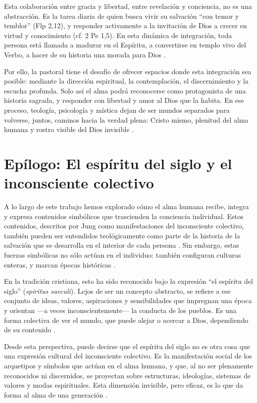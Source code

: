 \documentclass[a4paper,12pt]{article}
\begin{document}
Esta colaboración entre gracia y libertad, entre revelación y conciencia, no es una abstracción. Es la tarea diaria de quien busca vivir su salvación “con temor y temblor” \cite{bibid}(Flp 2,12), y responder activamente a la invitación de Dios a crecer en virtud y conocimiento \cite{bibid}(cf. 2 Pe 1,5). En esta dinámica de integración, toda persona está llamada a madurar en el Espíritu, a convertirse en templo vivo del Verbo, a hacer de su historia una morada para Dios \cite{jung1959}.

Por ello, la pastoral tiene el desafío de ofrecer espacios donde esta integración sea posible: mediante la dirección espiritual, la contemplación, el discernimiento y la escucha profunda. Solo así el alma podrá reconocerse como protagonista de una historia sagrada, y responder con libertad y amor al Dios que la habita. En ese proceso, teología, psicología y mística dejan de ser mundos separados para volverse, juntos, caminos hacia la verdad plena: Cristo mismo, plenitud del alma humana y rostro visible del Dios invisible \cite{jung1959}.

\section*{Epílogo: El espíritu del siglo y el inconsciente colectivo}

A lo largo de este trabajo hemos explorado cómo el alma humana recibe, integra y expresa contenidos simbólicos que trascienden la conciencia individual. Estos contenidos, descritos por Jung como manifestaciones del inconsciente colectivo, también pueden ser entendidos teológicamente como parte de la historia de la salvación que se desarrolla en el interior de cada persona \cite{jung1959}. Sin embargo, estas fuerzas simbólicas no sólo actúan en el individuo: también configuran culturas enteras, y marcan épocas históricas \cite{jung1959}.

En la tradición cristiana, esto ha sido reconocido bajo la expresión “el espíritu del siglo” (\textit{spiritus saeculi}). Lejos de ser un concepto abstracto, se refiere a ese conjunto de ideas, valores, aspiraciones y sensibilidades que impregnan una época y orientan —a veces inconscientemente— la conducta de los pueblos. Es una forma colectiva de ver el mundo, que puede alejar o acercar a Dios, dependiendo de su contenido \cite{jung1959}.

Desde esta perspectiva, puede decirse que el espíritu del siglo no es otra cosa que una expresión cultural del inconsciente colectivo. Es la manifestación social de los arquetipos y símbolos que actúan en el alma humana, y que, al no ser plenamente reconocidos ni discernidos, se proyectan sobre estructuras, ideologías, sistemas de valores y modas espirituales. Esta dimensión invisible, pero eficaz, es lo que da forma al alma de una generación \cite{jung1959}.
\end{document}
